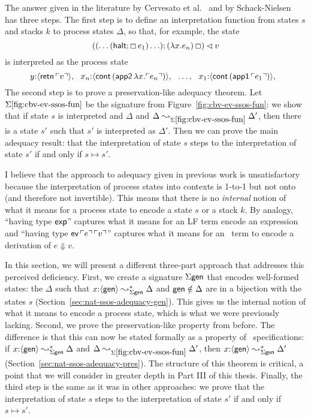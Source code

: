 The answer given in the literature by Cervesato et
al.~\cite{cervesato02concurrent} and by
Schack-Nielsen~\cite{schacknielsen07induction} has three steps. The
first step is to define an interpretation function from states $s$
and stacks $k$ to process states $\Delta$, so that, for example, the
state
\[
((\ldots({\sf halt}; \Box\,e_1)\ldots); (\lambda x.e_n)\,\Box) \lhd v
\]
is interpreted as the process state
\[
y{:}\langle {{\sf retn}\,{\ulcorner{v}\urcorner}} \rangle, ~~
x_n{:}\langle {{\sf cont}\,({\sf app2}\,\lambda x.{\ulcorner{e_n}\urcorner})} \rangle, ~~
\ldots, ~~
x_1{:}\langle {{\sf cont}\,({\sf app1}\,{\ulcorner{e_1}\urcorner})} \rangle, ~~
\]
The second step is to prove a preservation-like adequacy theorem. Let
$\Sigma\ref{fig:cbv-ev-ssos-fun}$ be the signature from
Figure~\ref{fig:cbv-ev-ssos-fun}: we show that if state $s$ is
interpreted and $\Delta$ and $\Delta
\leadsto_{\Sigma\ref{fig:cbv-ev-ssos-fun}} \Delta'$, then there is a
state $s'$ such that $s'$ is interpreted as $\Delta'$. Then we can
prove the main adequacy result: that the interpretation of state $s$
steps to the interpretation of state $s'$ if and only if $s \mapsto
s'$.

I believe that the approach to adequacy given in previous work is
unsatisfactory because the interpretation of process states into
contexts is 1-to-1 but not onto (and therefore not invertible).  This
means that there is no {\it internal} notion of what it means for a
process state to encode a state $s$ or a stack $k$. By analogy,
``having type ${\sf exp}$'' captures what it means for an LF term
encode an expression and ``having type ${\sf
  ev}\,{\ulcorner{e}\urcorner}\,{\ulcorner{v}\urcorner}$'' captures what it means for an
\sls~term to encode a derivation of $e \Downarrow v$.

In this section, we will present a different three-part approach that
addresses this perceived deficiency. First, we create a signature
$\Sigma\sf gen$ that encodes well-formed states: the $\Delta$ such
that $x{:}\langle {\sf gen} \rangle \leadsto^*_{\Sigma\sf gen} \Delta$ and ${\sf
  gen} \notin \Delta$ are in a bijection with the states $s$
(Section~\ref{sec:nat-ssos-adequacy-gen}). This gives us the internal
notion of what it means to encode a process state, which is what we
were previously lacking. Second, we prove the preservation-like
property from before. The difference is that this can now be stated
formally as a property of \sls~specifications: if $x{:}\langle {\sf gen} \rangle
\leadsto^*_{\Sigma\sf gen} \Delta$ and $\Delta
\leadsto_{\Sigma\ref{fig:cbv-ev-ssos-fun}} \Delta'$, then $x{:}
\langle {\sf gen} \rangle \leadsto^*_{\Sigma\sf gen} \Delta'$
(Section~\ref{sec:nat-ssos-adequacy-pres}). The structure of this
theorem is critical, a point that we will consider in greater depth in
Part III of this thesis. Finally, the third step is the same as it was
in other approaches: we prove that the interpretation of state $s$
steps to the interpretation of state $s'$ if and only if $s \mapsto s'$.

